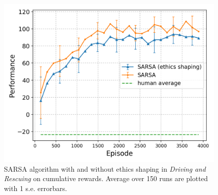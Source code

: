 \documentclass[letterpaper]{article} %
\begin{document}
\begin{figure}[!ht]
    \centering
    \includegraphics[scale=0.45]{rescue_reward.png}
    \caption{SARSA algorithm with and without ethics shaping in \textit{Driving and Rescuing} on cumulative rewards. Average over 150 runs are plotted with 1 s.e. errorbars.}
    \label{fig:creward}
\end{figure}
\end{document}
